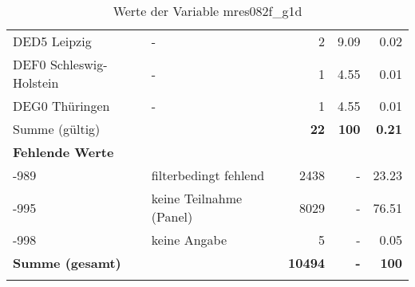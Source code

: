 \begin{longtable}{Xlrrr}
     \multicolumn{1}{X}{DED5 Leipzig} &
     - &
     \num{2} &
     \num[round-mode=places,round-precision=2]{9.09} &
     \num[round-mode=places,round-precision=2]{0.02} \\

     \multicolumn{1}{X}{DEF0 Schleswig-Holstein} &
     - &
     \num{1} &
     \num[round-mode=places,round-precision=2]{4.55} &
     \num[round-mode=places,round-precision=2]{0.01} \\

     \multicolumn{1}{X}{DEG0 Thüringen} &
     - &
     \num{1} &
     \num[round-mode=places,round-precision=2]{4.55} &
     \num[round-mode=places,round-precision=2]{0.01} \\
     \midrule
      \multicolumn{2}{l}{Summe (gültig)} & \textbf{\num{22}} &
      \textbf{\num{100}} &
         \textbf{\num[round-mode=places,round-precision=2]{0.21}} \\
     \multicolumn{5}{l}{\textbf{Fehlende Werte}}\\
       -989 & filterbedingt fehlend & \num{2438} & - & \num[round-mode=places,round-precision=2]{23.23} \\

       -995 & keine Teilnahme (Panel) & \num{8029} & - & \num[round-mode=places,round-precision=2]{76.51} \\

       -998 & keine Angabe & \num{5} & - & \num[round-mode=places,round-precision=2]{0.05} \\

     \midrule
     \multicolumn{2}{l}{\textbf{Summe (gesamt)}} & \textbf{\num{10494}} & \textbf{-} & \textbf{\num{100}} \\
     \bottomrule
     \caption{Werte der Variable mres082f\_g1d}
     \end{longtable}
     
